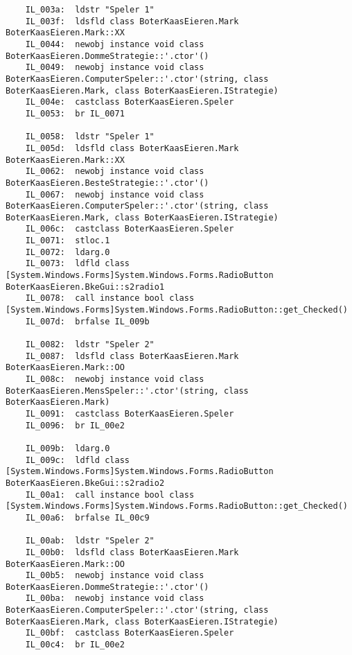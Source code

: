 \begin{lstlisting}
	IL_003a:  ldstr "Speler 1"
	IL_003f:  ldsfld class BoterKaasEieren.Mark BoterKaasEieren.Mark::XX
	IL_0044:  newobj instance void class BoterKaasEieren.DommeStrategie::'.ctor'()
	IL_0049:  newobj instance void class BoterKaasEieren.ComputerSpeler::'.ctor'(string, class BoterKaasEieren.Mark, class BoterKaasEieren.IStrategie)
	IL_004e:  castclass BoterKaasEieren.Speler
	IL_0053:  br IL_0071

	IL_0058:  ldstr "Speler 1"
	IL_005d:  ldsfld class BoterKaasEieren.Mark BoterKaasEieren.Mark::XX
	IL_0062:  newobj instance void class BoterKaasEieren.BesteStrategie::'.ctor'()
	IL_0067:  newobj instance void class BoterKaasEieren.ComputerSpeler::'.ctor'(string, class BoterKaasEieren.Mark, class BoterKaasEieren.IStrategie)
	IL_006c:  castclass BoterKaasEieren.Speler
	IL_0071:  stloc.1 
	IL_0072:  ldarg.0 
	IL_0073:  ldfld class [System.Windows.Forms]System.Windows.Forms.RadioButton BoterKaasEieren.BkeGui::s2radio1
	IL_0078:  call instance bool class [System.Windows.Forms]System.Windows.Forms.RadioButton::get_Checked()
	IL_007d:  brfalse IL_009b

	IL_0082:  ldstr "Speler 2"
	IL_0087:  ldsfld class BoterKaasEieren.Mark BoterKaasEieren.Mark::OO
	IL_008c:  newobj instance void class BoterKaasEieren.MensSpeler::'.ctor'(string, class BoterKaasEieren.Mark)
	IL_0091:  castclass BoterKaasEieren.Speler
	IL_0096:  br IL_00e2

	IL_009b:  ldarg.0 
	IL_009c:  ldfld class [System.Windows.Forms]System.Windows.Forms.RadioButton BoterKaasEieren.BkeGui::s2radio2
	IL_00a1:  call instance bool class [System.Windows.Forms]System.Windows.Forms.RadioButton::get_Checked()
	IL_00a6:  brfalse IL_00c9

	IL_00ab:  ldstr "Speler 2"
	IL_00b0:  ldsfld class BoterKaasEieren.Mark BoterKaasEieren.Mark::OO
	IL_00b5:  newobj instance void class BoterKaasEieren.DommeStrategie::'.ctor'()
	IL_00ba:  newobj instance void class BoterKaasEieren.ComputerSpeler::'.ctor'(string, class BoterKaasEieren.Mark, class BoterKaasEieren.IStrategie)
	IL_00bf:  castclass BoterKaasEieren.Speler
	IL_00c4:  br IL_00e2


\end{lstlisting}
